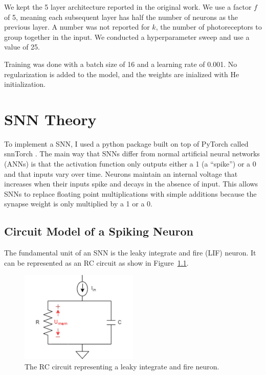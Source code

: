 \documentclass [MS] {UCLAthesis}
\begin{document}
We kept the 5 layer architecture reported in the original work. We use a factor $f$ of 5, meaning each subsequent layer has half the number of neurons as the previous layer. A number was not reported for $k$, the number of photoreceptors to group together in the input. We conducted a hyperparameter sweep and use a value of 25.

Training was done with a batch size of 16 and a learning rate of 0.001. No regularization is added to the model, and the weights are inialized with He initialization.


\chapter{SNN Theory}
\label{appendix:snn}

To implement a SNN, I used a python package built on top of PyTorch called snnTorch \citep{snnTorch}. The main way that SNNs differ from normal artificial neural networks (ANNs) is that the activation function only outputs either a 1 (a ``spike'') or a 0 and that inputs vary over time. Neurons maintain an internal voltage that increases when their inputs spike and decays in the absence of input. This allows SNNs to replace floating point multiplications with simple additions because the synapse weight is only multiplied by a 1 or a 0.


\section{Circuit Model of a Spiking Neuron}

The fundamental unit of an SNN is the leaky integrate and fire (LIF) neuron. It can be represented as an RC circuit as show in Figure~\ref{fig:rc_circuit}.

\begin{figure}
    \centering
    \includegraphics[width=0.5\textwidth]{RC_neuron}
    \caption[RC circuit representation of a LIF neuron]{The RC circuit representing a leaky integrate and fire neuron.}
    \label{fig:rc_circuit}
\end{figure}
\end{document}
